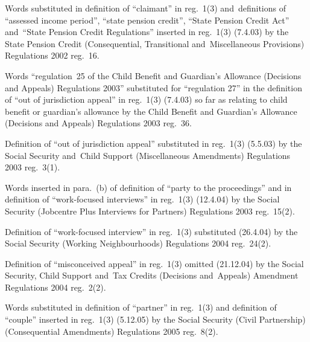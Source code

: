 \documentclass[12pt,a4paper]{article}
\begin{document}
{

Words substituted in definition of ``claimant'' in reg.~1(3) and~definitions of ``assessed income period'', ``state pension credit'', ``State Pension Credit Act'' and~``State Pension Credit Regulations'' inserted in reg.~1(3) (7.4.03) by the State Pension Credit (Consequential, Transitional and~Miscellaneous Provisions) Regulations 2002 reg.~16.

Words ``regulation~25 of the Child Benefit and Guardian's Allowance (Decisions and Appeals) Regulations 2003'' substituted for ``regulation 27'' in the definition of ``out of jurisdiction appeal'' in reg.~1(3) (7.4.03) so far as relating to child benefit or guardian's allowance by the Child Benefit and Guardian’s Allowance (Decisions and Appeals) Regulations 2003 reg.~36.

Definition of ``out of jurisdiction appeal'' substituted in reg.~1(3) (5.5.03) by the Social Security and~Child Support (Miscellaneous Amendments) Regulations 2003 reg.~3(1).

Words inserted in para.~(b) of definition of ``party to the proceedings'' and in definition of ``work-focused interviews'' in reg.~1(3) (12.4.04) by the Social Security (Jobcentre Plus Interviews for Partners) Regulations 2003 reg.~15(2).

Definition of ``work-focused interview'' in reg.~1(3) substituted (26.4.04) by the Social Security (Working Neighbourhoods) Regulations 2004 reg.~24(2).

Definition of ``misconceived appeal'' in reg.~1(3) omitted (21.12.04) by the Social Security, Child Support and~Tax Credits (Decisions and~Appeals) Amendment Regulations 2004 reg.~2(2).

Words substituted in definition of ``partner'' in reg.~1(3) and definition of ``couple'' inserted in reg.~1(3) (5.12.05) by the Social Security (Civil Partnership) (Consequential Amendments) Regulations 2005 reg.~8(2).

}
\end{document}
